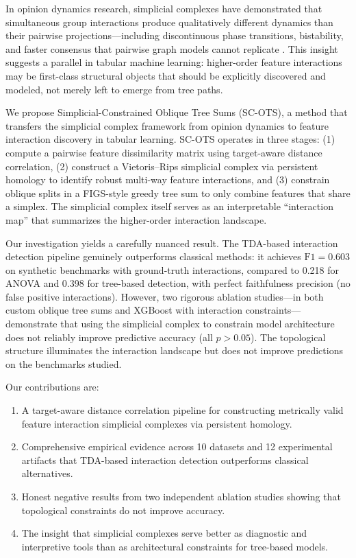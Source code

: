 \documentclass[11pt,letterpaper]{article}
\begin{document}
In opinion dynamics research, simplicial complexes have demonstrated that simultaneous group interactions produce qualitatively different dynamics than their pairwise projections---including discontinuous phase transitions, bistability, and faster consensus that pairwise graph models cannot replicate \citep{Iacopini2019, Battiston2021}. This insight suggests a parallel in tabular machine learning: higher-order feature interactions may be first-class structural objects that should be explicitly discovered and modeled, not merely left to emerge from tree paths.

We propose Simplicial-Constrained Oblique Tree Sums (SC-OTS), a method that transfers the simplicial complex framework from opinion dynamics to feature interaction discovery in tabular learning. SC-OTS operates in three stages: (1) compute a pairwise feature dissimilarity matrix using target-aware distance correlation, (2) construct a Vietoris--Rips simplicial complex via persistent homology to identify robust multi-way feature interactions, and (3) constrain oblique splits in a FIGS-style \citep{Tan2022} greedy tree sum to only combine features that share a simplex. The simplicial complex itself serves as an interpretable ``interaction map'' that summarizes the higher-order interaction landscape.

Our investigation yields a carefully nuanced result. The TDA-based interaction detection pipeline genuinely outperforms classical methods: it achieves $\text{F1} = 0.603$ on synthetic benchmarks with ground-truth interactions, compared to 0.218 for ANOVA and 0.398 for tree-based detection, with perfect faithfulness precision (no false positive interactions). However, two rigorous ablation studies---in both custom oblique tree sums and XGBoost with interaction constraints---demonstrate that using the simplicial complex to constrain model architecture does not reliably improve predictive accuracy (all $p > 0.05$). The topological structure illuminates the interaction landscape but does not improve predictions on the benchmarks studied.

Our contributions are:
\begin{enumerate}
    \item A target-aware distance correlation pipeline for constructing metrically valid feature interaction simplicial complexes via persistent homology.
    \item Comprehensive empirical evidence across 10 datasets and 12 experimental artifacts that TDA-based interaction detection outperforms classical alternatives.
    \item Honest negative results from two independent ablation studies showing that topological constraints do not improve accuracy.
    \item The insight that simplicial complexes serve better as diagnostic and interpretive tools than as architectural constraints for tree-based models.
\end{enumerate}
\end{document}
